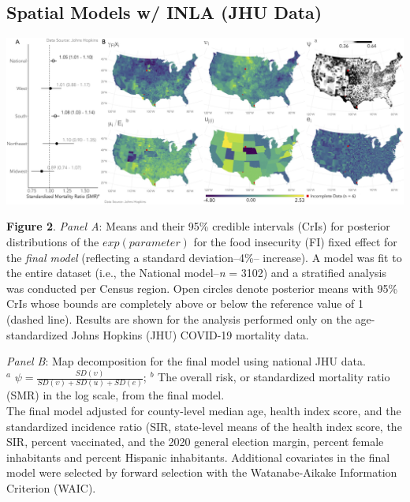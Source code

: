 \documentclass[aspectratio=169]{beamer}
\begin{document}
 \subsection{Spatial Models w/ INLA (JHU Data)}
\begin{frame}
	
	
	
	\vspace*{-0.02 cm}
	\hspace*{-0.35 cm}
	\centering
	\includegraphics[scale=0.093]{images-logos/combo-forest-map-decomp-jhu.png}
	
	\raggedright
	\tiny{\textbf{Figure 2}. \textit{Panel A}: Means and their 95\% credible intervals (CrIs) for posterior distributions of the $exp(parameter)$ for the food insecurity (FI) fixed effect for the \textit{final model} (reflecting a standard deviation--4\%-- increase). A model was fit to the entire dataset (i.e., the National model--\textit{n} = 3102) and a stratified analysis was conducted per Census region. Open circles denote posterior means with 95\% CrIs whose bounds are completely above or below the reference value of 1 (dashed line). Results are shown for the analysis performed only on the age-standardized Johns Hopkins (JHU) COVID-19 mortality data. 
		
		\vspace{0.25cm}
		
		\textit{Panel B}: Map decomposition for the final model using national JHU data.\\
		$^a$ $\psi=\frac{SD(\upsilon)}{SD(\upsilon)+SD(u)+SD(e)}$;
		$^b$ The overall risk, or standardized mortality ratio (SMR) in the log scale, from the final model.\\
		The final model adjusted for county-level median age, health index score, and the standardized incidence ratio (SIR, state-level means of the health index score, the SIR, percent vaccinated, and the 2020 general election margin, percent female inhabitants and percent Hispanic inhabitants. Additional covariates in the final model were selected by forward selection with the Watanabe-Aikake Information Criterion (WAIC).}
	
	
\end{frame}
\end{document}

